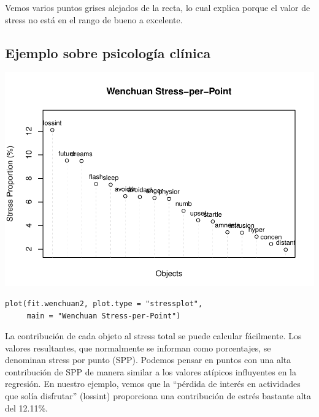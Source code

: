 \documentclass[]{article}
\begin{document}
Vemos varios puntos grises alejados de la recta, lo cual explica porque
el valor de stress no está en el rango de bueno a excelente.

\subsection{Ejemplo sobre psicología
clínica}\label{ejemplo-sobre-psicologuxeda-cluxednica-13}

\hypertarget{left}{}
\includegraphics{Clase-4_files/figure-latex/unnamed-chunk-36-1.pdf}

\hypertarget{right}{}
\begin{verbatim}
plot(fit.wenchuan2, plot.type = "stressplot",
     main = "Wenchuan Stress-per-Point")
\end{verbatim}

La contribución de cada objeto al stress total se puede calcular
fácilmente. Los valores resultantes, que normalmente se informan como
porcentajes, se denominan stress por punto (SPP). Podemos pensar en
puntos con una alta contribución de SPP de manera similar a los valores
atípicos influyentes en la regresión. En nuestro ejemplo, vemos que la
``pérdida de interés en actividades que solía disfrutar'' (lossint)
proporciona una contribución de estrés bastante alta del 12.11\%.
\end{document}
